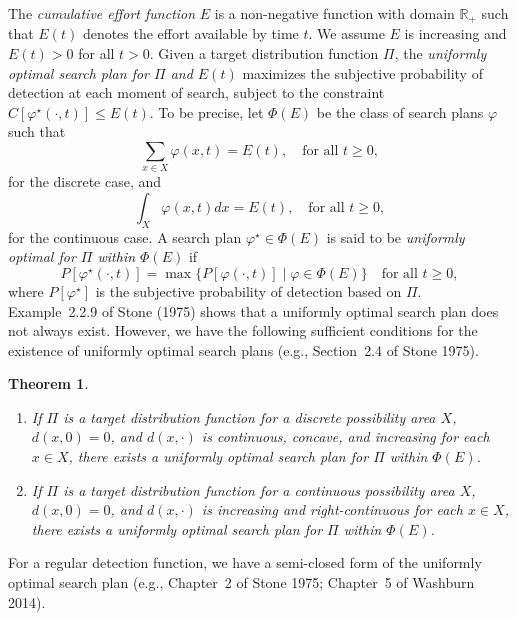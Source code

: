 \documentclass[12pt]{article}
\newtheorem{theorem}{Theorem}[section]
\theoremstyle{plain}
\theoremstyle{definition}
\theoremstyle{remark}
\begin{document}
The \emph{cumulative effort function} $E$ is a non-negative function with domain $\mathbb{R}_+$ such that $E(t)$ denotes the effort available by time $t$.  We assume $E$ is increasing and $E(t)>0$ for all $t>0$.  Given a target distribution function $\Pi$,  the \emph{uniformly optimal search plan for $\Pi$ and $E(t)$}  maximizes the subjective probability of detection at each moment of search, subject to the constraint $C[\varphi^\star(\cdot, t)]\leq E(t)$.  To be precise, let $\Phi(E)$ be the class of search plans $\varphi$ such that 
\begin{equation}
\label{eq:uniformdis1}
\sum_{x\in X}\varphi(x, t)=E(t), \quad \text{for all $t\geq0$},
\end{equation}
for the discrete case,  and 
\begin{equation}
\label{eq:uniformcon1}
\int_X\varphi(x, t)dx=E(t), \quad \text{for all $t\geq0$},
\end{equation}
for the continuous case. A search plan $\varphi^\star\in \Phi(E)$ is said to be \emph{uniformly optimal for $\Pi$ within $\Phi(E)$} if 
\begin{equation}
\label{eq:uniform}
P[\varphi^\star(\cdot, t)]=\max\{P[\varphi(\cdot, t)]\mid \varphi\in \Phi(E)\}\quad \text{for all $t\geq 0$},
\end{equation}
where $P[\varphi^\star]$ is the subjective probability of detection based on $\Pi$.  Example~2.2.9 of Stone (1975) shows that a uniformly optimal search plan does not always exist.  However, we have the following sufficient conditions for the existence of uniformly optimal search plans (e.g., Section~2.4 of Stone 1975).

\begin{theorem}
\label{thm:unifexistence}
\
\begin{enumerate}
\item[(i)]If $\Pi$ is a target distribution function for a discrete possibility area $X$, $d(x, 0)=0$,  and $d(x, \cdot)$ is continuous,  concave, and increasing for each $x\in X$,  there exists a uniformly optimal search plan for $\Pi$ within $\Phi(E)$.   
\item[(ii)]If $\Pi$ is a target distribution function for a continuous possibility area $X$,  $d(x, 0)=0$, and $d(x, \cdot)$ is increasing and right-continuous for each $x\in X$,  there exists a uniformly optimal search plan for $\Pi$  within $\Phi(E)$.   
\end{enumerate}
\end{theorem}


For a regular detection function,  we have a semi-closed form of the uniformly optimal search plan (e.g.,   Chapter~2 of Stone 1975; Chapter~5 of Washburn 2014).  
\end{document}
